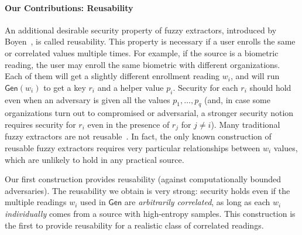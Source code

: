\documentclass[11pt]{article}
\newcommand{\consref}[1]{\mbox{Construction~\ref{#1}}}
\newcommand{\class}[1]{{\ensuremath{\mathsf{#1}}}}
\newcommand{\gen}{\ensuremath{\class{Gen}}\xspace}
\begin{document}
\paragraph{Our Contributions: Reusability}
An additional desirable security property of fuzzy extractors, introduced by Boyen~\cite{Boyen2004}, is called reusability. This property is necessary if a user enrolls the same or correlated values multiple times. For example, if the source is a biometric reading, the user may enroll the same biometric with different organizations.  Each of them will get a slightly different enrollment reading $w_i$, and will run $\gen(w_i)$ to get a key $r_i$ and a helper value $p_i$. Security for each $r_i$ should hold even when an adversary is given all the values $p_1, \dots, p_q$ (and, in case some organizations turn out to compromised or adversarial, a stronger security notion requires security for $r_i$ even in the presence of $r_j$ for $j\neq i$).  Many traditional fuzzy extractors are not reusable~\cite{Boyen2004,simoens2009privacy,blanton2012non,blanton2013analysis}. In fact, the only known construction of reusable fuzzy extractors \cite{Boyen2004} requires very particular relationships between $w_i$ values, which are unlikely to hold in any practical source.

Our first construction provides reusability (against computationally bounded adversaries).  
The reusability we obtain is very strong:  security holds even if the multiple readings $w_i$ used in $\gen$ are \emph{arbitrarily correlated}, as long as each $w_i$ \emph{individually} comes from a source with high-entropy samples. This construction is the first to provide reusability for a realistic class of correlated readings.
 





\end{document}
